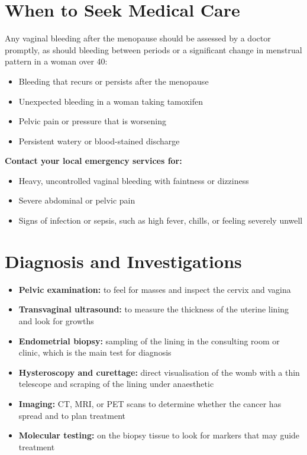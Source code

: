 \section*{When to Seek Medical Care}
Any vaginal bleeding after the menopause should be assessed by a doctor promptly, as should bleeding between periods or a significant change in menstrual pattern in a woman over 40:
\begin{itemize}
    \item Bleeding that recurs or persists after the menopause
    \item Unexpected bleeding in a woman taking tamoxifen
    \item Pelvic pain or pressure that is worsening
    \item Persistent watery or blood-stained discharge
\end{itemize}

\textbf{Contact your local emergency services for:}
\begin{itemize}
    \item Heavy, uncontrolled vaginal bleeding with faintness or dizziness
    \item Severe abdominal or pelvic pain
    \item Signs of infection or sepsis, such as high fever, chills, or feeling severely unwell
\end{itemize}

\section*{Diagnosis and Investigations}
\begin{itemize}
    \item \textbf{Pelvic examination:} to feel for masses and inspect the cervix and vagina
    \item \textbf{Transvaginal ultrasound:} to measure the thickness of the uterine lining and look for growths
    \item \textbf{Endometrial biopsy:} sampling of the lining in the consulting room or clinic, which is the main test for diagnosis
    \item \textbf{Hysteroscopy and curettage:} direct visualisation of the womb with a thin telescope and scraping of the lining under anaesthetic
    \item \textbf{Imaging:} CT, MRI, or PET scans to determine whether the cancer has spread and to plan treatment
    \item \textbf{Molecular testing:} on the biopsy tissue to look for markers that may guide treatment
\end{itemize}

